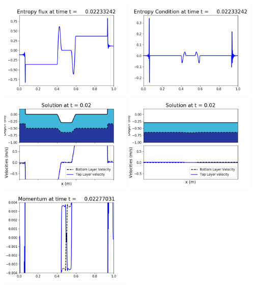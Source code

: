 \documentclass[11pt]{article}
\begin{document}
\includegraphics[width=0.475\textwidth]{frame0052fig1008.png}
\vskip 10pt 
\includegraphics[width=0.475\textwidth]{frame0052fig1009.png}
\vskip 10pt 
\includegraphics[width=0.475\textwidth]{frame0053fig1001.png}
\includegraphics[width=0.475\textwidth]{frame0053fig1002.png}
\vskip 10pt 
\includegraphics[width=0.475\textwidth]{frame0053fig1003.png}
\end{document}
